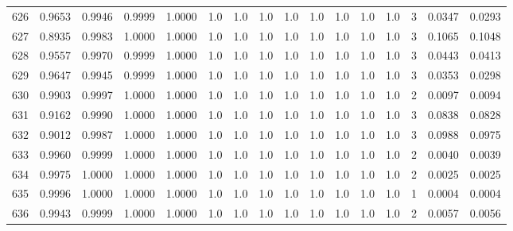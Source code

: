 \begin{tabular}{lrrrrrrrrrrrrrrr}
626 &      0.9653 &  0.9946 &  0.9999 &  1.0000 &     1.0 &     1.0 &     1.0 &     1.0 &     1.0 &     1.0 &      1.0 &        1.0 &      3 &                    0.0347 &                     0.0293 \\
627 &      0.8935 &  0.9983 &  1.0000 &  1.0000 &     1.0 &     1.0 &     1.0 &     1.0 &     1.0 &     1.0 &      1.0 &        1.0 &      3 &                    0.1065 &                     0.1048 \\
628 &      0.9557 &  0.9970 &  0.9999 &  1.0000 &     1.0 &     1.0 &     1.0 &     1.0 &     1.0 &     1.0 &      1.0 &        1.0 &      3 &                    0.0443 &                     0.0413 \\
629 &      0.9647 &  0.9945 &  0.9999 &  1.0000 &     1.0 &     1.0 &     1.0 &     1.0 &     1.0 &     1.0 &      1.0 &        1.0 &      3 &                    0.0353 &                     0.0298 \\
630 &      0.9903 &  0.9997 &  1.0000 &  1.0000 &     1.0 &     1.0 &     1.0 &     1.0 &     1.0 &     1.0 &      1.0 &        1.0 &      2 &                    0.0097 &                     0.0094 \\
631 &      0.9162 &  0.9990 &  1.0000 &  1.0000 &     1.0 &     1.0 &     1.0 &     1.0 &     1.0 &     1.0 &      1.0 &        1.0 &      3 &                    0.0838 &                     0.0828 \\
632 &      0.9012 &  0.9987 &  1.0000 &  1.0000 &     1.0 &     1.0 &     1.0 &     1.0 &     1.0 &     1.0 &      1.0 &        1.0 &      3 &                    0.0988 &                     0.0975 \\
633 &      0.9960 &  0.9999 &  1.0000 &  1.0000 &     1.0 &     1.0 &     1.0 &     1.0 &     1.0 &     1.0 &      1.0 &        1.0 &      2 &                    0.0040 &                     0.0039 \\
634 &      0.9975 &  1.0000 &  1.0000 &  1.0000 &     1.0 &     1.0 &     1.0 &     1.0 &     1.0 &     1.0 &      1.0 &        1.0 &      2 &                    0.0025 &                     0.0025 \\
635 &      0.9996 &  1.0000 &  1.0000 &  1.0000 &     1.0 &     1.0 &     1.0 &     1.0 &     1.0 &     1.0 &      1.0 &        1.0 &      1 &                    0.0004 &                     0.0004 \\
636 &      0.9943 &  0.9999 &  1.0000 &  1.0000 &     1.0 &     1.0 &     1.0 &     1.0 &     1.0 &     1.0 &      1.0 &        1.0 &      2 &                    0.0057 &                     0.0056 \\

\end{tabular}

